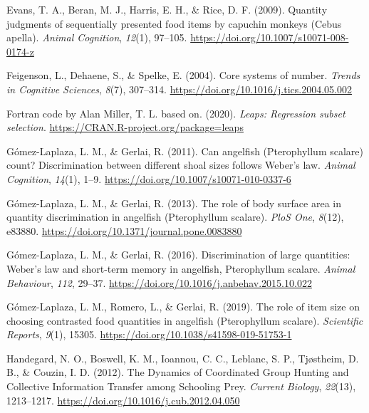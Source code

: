 \documentclass[
  ,doc,floatsintext]{apa6}
\newlength{\cslhangindent}
\newlength{\cslentryspacingunit} %
\newenvironment{CSLReferences}[2] %
 {%
  \setlength{\parindent}{0pt}
  \ifodd #1
  \let\oldpar\par
  \def\par{\hangindent=\cslhangindent\oldpar}
  \fi
  \setlength{\parskip}{#2\cslentryspacingunit}
 }%
 {}
\begin{document}
\begin{CSLReferences}{1}{0}
\leavevmode{}%
Evans, T. A., Beran, M. J., Harris, E. H., \& Rice, D. F. (2009). Quantity judgments of sequentially presented food items by capuchin monkeys ({Cebus} apella). \emph{Animal Cognition}, \emph{12}(1), 97--105. \url{https://doi.org/10.1007/s10071-008-0174-z}

\leavevmode{}%
Feigenson, L., Dehaene, S., \& Spelke, E. (2004). Core systems of number. \emph{Trends in Cognitive Sciences}, \emph{8}(7), 307--314. \url{https://doi.org/10.1016/j.tics.2004.05.002}

\leavevmode{}%
Fortran code by Alan Miller, T. L. based on. (2020). \emph{Leaps: Regression subset selection}. \url{https://CRAN.R-project.org/package=leaps}

\leavevmode{}%
Gómez-Laplaza, L. M., \& Gerlai, R. (2011). Can angelfish ({Pterophyllum} scalare) count? {Discrimination} between different shoal sizes follows {Weber}'s law. \emph{Animal Cognition}, \emph{14}(1), 1--9. \url{https://doi.org/10.1007/s10071-010-0337-6}

\leavevmode{}%
Gómez-Laplaza, L. M., \& Gerlai, R. (2013). The role of body surface area in quantity discrimination in angelfish ({Pterophyllum} scalare). \emph{PloS One}, \emph{8}(12), e83880. \url{https://doi.org/10.1371/journal.pone.0083880}

\leavevmode{}%
Gómez-Laplaza, L. M., \& Gerlai, R. (2016). Discrimination of large quantities: {Weber}'s law and short-term memory in angelfish, {Pterophyllum} scalare. \emph{Animal Behaviour}, \emph{112}, 29--37. \url{https://doi.org/10.1016/j.anbehav.2015.10.022}

\leavevmode{}%
Gómez-Laplaza, L. M., Romero, L., \& Gerlai, R. (2019). The role of item size on choosing contrasted food quantities in angelfish ({Pterophyllum} scalare). \emph{Scientific Reports}, \emph{9}(1), 15305. \url{https://doi.org/10.1038/s41598-019-51753-1}

\leavevmode{}%
Handegard, N. O., Boswell, K. M., Ioannou, C. C., Leblanc, S. P., Tjøstheim, D. B., \& Couzin, I. D. (2012). The {Dynamics} of {Coordinated} {Group} {Hunting} and {Collective} {Information} {Transfer} among {Schooling} {Prey}. \emph{Current Biology}, \emph{22}(13), 1213--1217. \url{https://doi.org/10.1016/j.cub.2012.04.050}


\end{CSLReferences}
\end{document}
